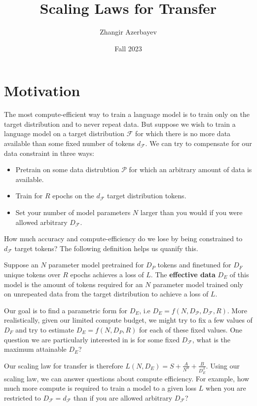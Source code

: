 \documentclass{article}
\title{Scaling Laws for Transfer}
\author{Zhangir Azerbayev} \date{Fall 2023}
\begin{document}
    \maketitle
    \section{Motivation}
    The most compute-efficient way to train a language model is to train only on the target distribution and to never repeat data. But suppose we wish to train a language model on a target distribution $\mathcal{F}$ for which there is no more data available than some fixed number of tokens $d_{\mathcal{F}}$. We can try to compensate for our data constraint in three ways:
    \begin{itemize}
        \item Pretrain on some data distrubtion $\mathcal{P}$ for which an arbitrary amount of data is available. 
        \item Train for $R$ epochs on the $d_{\mathcal{F}}$ target distribution tokens.
        \item Set your number of model parameters $N$ larger than you would if you were allowed arbitrary $D_{\mathcal{F}}$.
    \end{itemize}
    How much accuracy and compute-efficiency do we lose by being constrained to $d_{\mathcal{F}}$ target tokens? The following definition helps us quanify this.
    \begin{defn}
        Suppose an $N$ parameter model pretrained for $D_{P} $ tokens and finetuned for $D_{F} $ unique tokens over $R$ epochs achieves a loss of $L$. The {\bf effective data} $D_{E}$ of this model is the amount of tokens required for an $N$ parameter model trained only on unrepeated data from the target distribution to achieve a loss of $L$.
    \end{defn}
    Our goal is to find a parametric form for $D_{E}$, i.e $D_{E} = f\left(N, D_{\mathcal{P}}, D_{\mathcal{F}}, R\right)$. More realistically, given our limited compute budget, we might try to fix a few values of $D_{F}$ and try to estimate $D_{E} = f\left(N, D_{P}, R\right)$ for each of these fixed values. One question we are particularly interested in is for some fixed $D_{\mathcal{F}}$, what is the maximum attainable $D_{E}$?
    
    Our scaling law for transfer is therefore $L(N, D_{E}) = S + \frac{A}{N^\alpha} + \frac{B}{D_E^\beta}$. Using our scaling law, we can answer questions about compute efficiency. For example, how much more compute is required to train a model to a given loss $L$ when you are restricted to $D_{\mathcal{F}}=d_{\mathcal{F}}$ than if you are allowed arbitrary $D_{\mathcal{F}}$?
\end{document}
